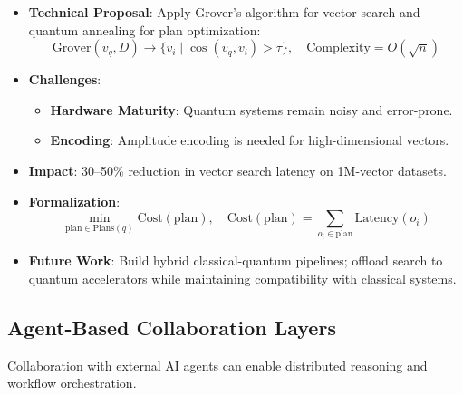 \documentclass[11pt]{article}
\begin{document}
\begin{itemize}
    \item \textbf{Technical Proposal}: Apply Grover's algorithm for vector search and quantum annealing for plan optimization:
        \[
        \text{Grover}(v_q, D) \rightarrow \{ v_i \mid \cos(v_q, v_i) > \tau \}, \quad \text{Complexity} = O(\sqrt{n})
        \]

    \item \textbf{Challenges}:
        \begin{itemize}
            \item \textbf{Hardware Maturity}: Quantum systems remain noisy and error-prone.
            \item \textbf{Encoding}: Amplitude encoding is needed for high-dimensional vectors.
        \end{itemize}

    \item \textbf{Impact}: 30–50\% reduction in vector search latency on 1M-vector datasets.

    \item \textbf{Formalization}:
        \[
        \min_{\text{plan} \in \text{Plans}(q)} \text{Cost}(\text{plan}), \quad \text{Cost}(\text{plan}) = \sum_{o_i \in \text{plan}} \text{Latency}(o_i)
        \]

    \item \textbf{Future Work}: Build hybrid classical-quantum pipelines; offload search to quantum accelerators while maintaining compatibility with classical systems.
\end{itemize}

\subsection{Agent-Based Collaboration Layers}
\label{subsec:agent_collaboration}

Collaboration with external AI agents can enable distributed reasoning and workflow orchestration.
\end{document}

